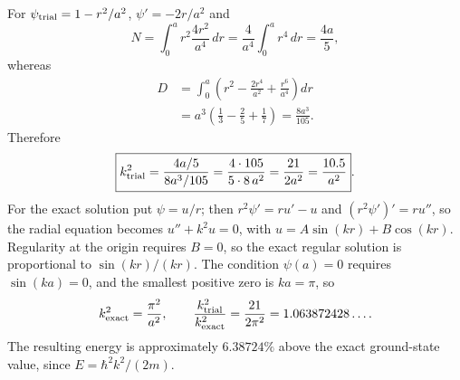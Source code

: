 For $\psi_{\rm trial}=1-r^2/a^2$, $\psi'=-2r/a^2$ and
\[
 N=\int_0^ar^2\frac{4r^2}{a^4}\,dr=\frac4{a^4}\int_0^ar^4\,dr=\frac{4a}{5},
\]
whereas
\begin{align*}
 D&=\int_0^a\left(r^2-\frac{2r^4}{a^2}+\frac{r^6}{a^4}\right)dr\\
  &=a^3\left(\frac13-\frac25+\frac17\right)
   =\frac{8a^3}{105}.
\end{align*}
Therefore
\[
 \boxed{k_{\rm trial}^2
 =\frac{4a/5}{8a^3/105}=\frac{4\cdot105}{5\cdot8\,a^2}=\frac{21}{2a^2}
 =\frac{10.5}{a^2}}.
\]
For the exact solution put $\psi=u/r$; then $r^2\psi'=ru'-u$ and
$(r^2\psi')'=ru''$, so the radial equation becomes $u''+k^2u=0$, with
$u=A\sin(kr)+B\cos(kr)$. Regularity at the origin requires $B=0$, so
the exact regular solution is proportional to
$\sin(kr)/(kr)$.  The condition $\psi(a)=0$ requires $\sin(ka)=0$, and
the smallest positive zero is $ka=\pi$, so
\[
 k_{\rm exact}^2=\frac{\pi^2}{a^2},\qquad
 \frac{k_{\rm trial}^2}{k_{\rm exact}^2}
 =\frac{21}{2\pi^2}=1.063872428\ldots.
\]
The resulting energy is approximately $6.38724\%$ above the exact
ground-state value, since $E=\hbar^2k^2/(2m)$.


